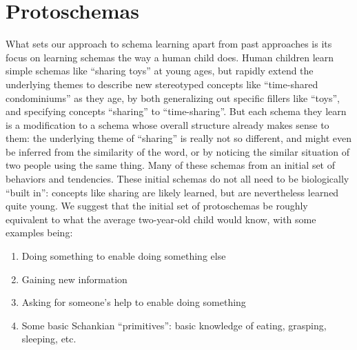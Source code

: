 \section{Protoschemas}
What sets our approach to schema learning apart from past approaches is its focus on learning schemas the way a human child does. Human children learn simple schemas like ``sharing toys'' at young ages, but rapidly extend the underlying themes to describe new stereotyped concepts like ``time-shared condominiums'' as they age, by both generalizing out specific fillers like ``toys'', and specifying concepts ``sharing'' to ``time-sharing''. But each schema they learn is a modification to a schema whose overall structure already makes sense to them: the underlying theme of ``sharing'' is really not so different, and might even be inferred from the similarity of the word, or by noticing the similar situation of two people using the same thing. Many of these schemas from an initial set of behaviors and tendencies. These initial schemas do not all need to be biologically ``built in'': concepts like sharing are likely learned, but are nevertheless learned quite young. We suggest that the initial set of protoschemas be roughly equivalent to what the average two-year-old child would know, with some examples being:

\begin{enumerate}
    \item Doing something to enable doing something else
    \item Gaining new information
    \item Asking for someone's help to enable doing something
    \item Some basic Schankian ``primitives'': basic knowledge of eating, grasping, sleeping, etc.
\end{enumerate}

